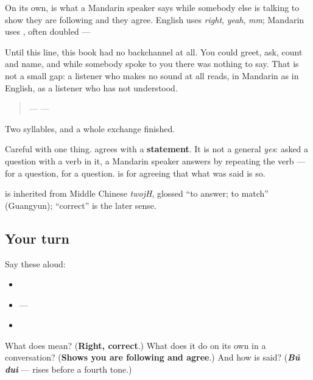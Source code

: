 \begin{culture}
On its own, \textbf{} is what a Mandarin speaker says while somebody else is talking to show they are following and they agree. English uses \emph{right}, \emph{yeah}, \emph{mm}; Mandarin uses \textbf{}, often doubled — \textbf{}

Until this line, this book had no backchannel at all. You could greet, ask, count and name, and while somebody spoke to you there was nothing to say. That is not a small gap: a listener who makes no sound at all reads, in Mandarin as in English, as a listener who has not understood.

\begin{quote}
— \textbf{} — \textbf{}
\end{quote}

Two syllables, and a whole exchange finished.

Careful with one thing. \textbf{} agrees with a \textbf{statement}. It is not a general \emph{yes}: asked a question with a verb in it, a Mandarin speaker answers by repeating the verb — \textbf{} for a  question, \textbf{} for a  question.  is for agreeing that what was said is so.
\end{culture}

\begin{cousinweb}
\textbf{} is inherited from Middle Chinese \emph{twojH}, glossed \textquotedblleft{}to answer; to match\textquotedblright{} (Guangyun); \textquotedblleft{}correct\textquotedblright{} is the later sense.
\end{cousinweb}

\subsection*{Your turn}
Say these aloud:

\begin{itemize}
\raggedright
  \item {}  
  \item {} — 
  \item {}
\end{itemize}

\begin{tcolorbox}[breakable,colback=teal!4,colframe=teal!35!black,title={Before you move on}]
What does  mean? (\textbf{Right, correct}.) What does it do on its own in a conversation? (\textbf{Shows you are following and agree}.) And how is  said? (\emph{\textbf{Bú duì}} —  rises before a fourth tone.)
\end{tcolorbox}
